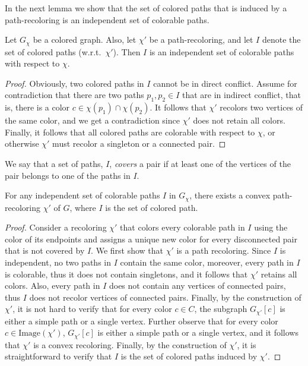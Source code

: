 In the next lemma we show that the set of colored paths that is
induced by a path-recoloring is an independent set of colorable paths.

\begin{lemma}
\label{lm:independent}
Let $G_\chi$ be a colored graph.
%
Also, 
let $\chi'$ be a path-recoloring,
and let $I$ denote the set of colored paths (w.r.t.\ $\chi'$).  
%
Then $I$ is an independent set of colorable paths with respect to $\chi$.
\end{lemma}

\begin{proof}
Obviously, 
two colored paths in $I$ cannot be in direct conflict.
%
Assume for contradiction that there are two paths $p_1, p_2 \in I$
that are in indirect conflict, 
that is, 
there is a color $c \in \chi(p_1) \cap \chi(p_2)$.
%
It follows that $\chi'$ recolors two vertices of the same color, 
and we get a contradiction since $\chi'$ does not retain all colors.
%
Finally, 
it follows that all colored paths are colorable with respect to $\chi$, 
or otherwise $\chi'$ must recolor a singleton or a connected pair.
\end{proof}

We say that a set of paths, $I$, \emph{covers} a pair if at least one of the
vertices of the pair belongs to one of the paths in $I$.

\begin{lemma}
\label{lm:independent_set_is_recoloring}
For any independent set of colorable paths $I$ in $G_{\chi}$, 
there exists a convex path-recoloring $\chi'$ of $G$, 
where $I$ is the set of colored path.
\end{lemma}

\begin{proof}
Consider a recoloring $\chi'$ that colors every colorable path in $I$
using the color of its endpoints and assigns a unique new color for
every disconnected pair that is not covered by $I$.
%
We first show that $\chi'$ is a path recoloring.  
%
Since $I$ is independent, 
no two paths in $I$ contain the same color, moreover,
every path in $I$ is colorable, 
thus it does not contain singletons, 
and it follows that $\chi'$ retains all colors.  
%
Also, every path in $I$ does not contain any vertices of connected pairs, 
thus $I$ does not recolor vertices of connected pairs.
%
Finally, by the construction of $\chi'$, 
it is not hard to verify that for every color $c \in C$,
the subgraph $G_{\chi'}[c]$ is either a simple path or a single vertex.
%
Further observe that for every color $c \in \text{Image}(\chi')$,
$G_{\chi'}[c]$ is either a simple path or a single vertex, and it
follows that $\chi'$ is a convex recoloring.  
%
Finally, by the
construction of $\chi'$, it is straightforward to verify that $I$ is
the set of colored paths induced by $\chi'$.
\end{proof}

